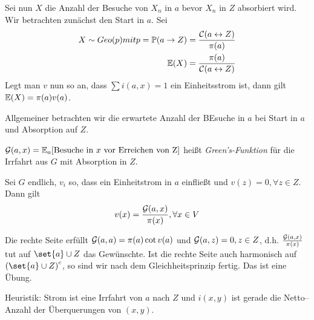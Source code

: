 Sei nun $X$ die Anzahl der Besuche von $X_n$ in $a$ bevor $X_n$ in $Z$ absorbiert wird. Wir betrachten zunächst den Start in $a$. Sei 
\begin{align}
	X \sim Geo(p) mit p= \prop{a \to Z} = \frac{\leit{a \leftrightarrow Z}}{\pi(a)} \\
	\EW{X} = \frac{\pi(a)}{\leit{a \leftrightarrow  Z}}
\end{align}
Legt man $v$ nun so an, dass $\sum i(a,x) = 1$ ein Einheitsstrom ist, dann gilt $\EW{X} = \pi(a)v(a)$.

Allgemeiner betrachten wir die erwartete Anzahl der BEsuche in $a$ bei Start in $a$ und Absorption auf $Z$.
\begin{definition}
	$\mathcal{G}(a,x) = \EW{\relax}_a \benb{\text{Besuche in $x$ vor Erreichen von Z}}$ heißt \emph{Green's-Funktion} für die Irrfahrt aus $G$ mit Absorption in $Z$.
\end{definition}

\begin{satz}
	Sei $G$ endlich, $v_i$ so, dass ein Einheitstrom in $a$ einfließt und $v(z) = 0, \forall z \in Z$. Dann gilt
	\begin{align}
		v(x) = \frac{\greens{a,x}}{\pi(x)}, \forall x \in V
	\end{align}
\end{satz}
\begin{beweis}
	Die rechte Seite erfüllt $\greens{a,a} = \pi(a) \cot v(a)$ und $\greens{a,z} = 0, z \in Z$, d.h. $\frac{\mathcal{G}\left(a,x\right)}{\pi(x)}$ tut auf $\set{a} \cup Z$ das Gewünschte. Ist die rechte Seite auch harmonisch auf  $\enb{\set{a} \cup Z}^c$, so sind wir nach dem Gleichheitsprinzip fertig. Das ist eine Übung.
\end{beweis}
Heuristik: Strom ist eine Irrfahrt von $a$ nach $Z$ und $i(x,y)$ ist gerade die Netto--Anzahl der Überquerungen von $(x,y)$.

